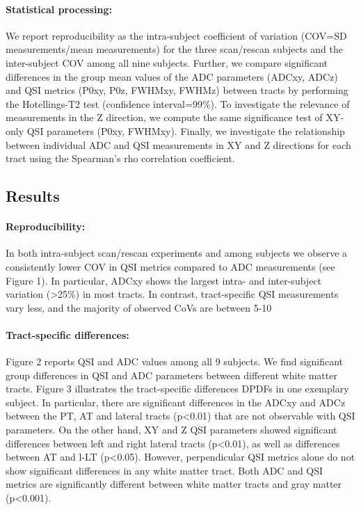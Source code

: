 \paragraph{Statistical processing:} We report reproducibility as the intra-subject coefficient of variation (COV=SD measurements/mean measurements) for the three scan/rescan subjects and the inter-subject COV among all nine subjects. Further, we compare significant differences in the group mean values of the ADC parameters (ADCxy, ADCz) and QSI metrics (P0xy, P0z, FWHMxy, FWHMz) between tracts by performing the Hotellings-T2 test (confidence interval=99\%). To investigate the relevance of measurements in the Z direction, we compute the same significance test of XY-only QSI parameters (P0xy, FWHMxy). Finally, we investigate the relationship between individual ADC and QSI measurements in XY and Z directions for each tract using the Spearman’s rho correlation coefficient. 
\subsection*{Results} 
\paragraph{Reproducibility:} In both intra-subject scan/rescan experiments and among subjects we observe a consistently lower COV in QSI metrics compared to ADC measurements (see Figure 1). In particular, ADCxy shows the largest intra- and inter-subject variation (>25\%) in most tracts. In contrast, tract-specific QSI measurements vary less, and the majority of observed CoVs are between 5-10

\paragraph{Tract-specific differences:} Figure 2 reports QSI and ADC values among all 9 subjects. We find significant group differences in QSI and ADC parameters between different white matter tracts. Figure 3 illustrates the tract-specific differences DPDFs in one exemplary subject. In particular, there are significant differences in the ADCxy and ADCz between the PT, AT and lateral tracts (p<0.01) that are not observable with QSI parameters. On the other hand, XY and Z QSI parameters showed significant differences between left and right lateral tracts (p<0.01), as well as differences between AT and l-LT (p<0.05). However, perpendicular QSI metrics alone do not show significant differences in any white matter tract. Both ADC and QSI metrics are significantly different between white matter tracts and gray matter (p<0.001). 
